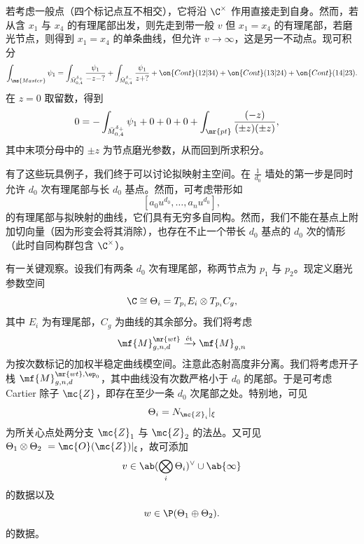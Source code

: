 \begin{exm}
    若考虑一般点（四个标记点互不相交），它将沿 \(\C^{\times}\) 作用直接走到自身。然而，若从含 \(x_1\) 与 \(x_4\) 的有理尾部出发，则先走到带一般 \(v\) 但 \(x_1 = x_4\) 的有理尾部，若磨光节点，则得到 \(x_1 = x_4\) 的单条曲线，但允许 \(v \to \infty\)，这是另一不动点。现可积分
    \begin{align*}
        \int_{\ms{Master}} \psi_1 = \int_{\bar{M}_{0,4}^{\delta_+}} \frac{\psi_1}{-z-?} + \int_{\bar{M}_{0,4}^{\delta_-}} \frac{\psi_1}{z+?} + \on{Cont}(12|34) + \on{Cont}(13|24) + \on{Cont}(14|23).
    \end{align*}
    在 \(z = 0\) 取留数，得到
    \begin{align*}
        0 &= - \int_{\bar{M}_{0,4}^{\delta_+}} \psi_1 + 0 + 0 + 0 + \int_{\mr{pt}} \frac{(-z)}{(\pm z)(\pm z)},
    \end{align*}
    其中末项分母中的 \(\pm z\) 为节点磨光参数，从而回到所求积分。
\end{exm}

有了这些玩具例子，我们终于可以讨论拟映射主空间。在 \(\frac{1}{d_0}\) 墙处的第一步是同时允许 \(d_0\) 次有理尾部与长 \(d_0\) 基点。然而，可考虑带形如
\[ [a_0 u^{d_0}, \ldots, a_n u^{d_0}], \]
的有理尾部与拟映射的曲线，它们具有无穷多自同构。然而，我们不能在基点上附加切向量（因为形变会将其消除），也存在不止一个带长 \(d_0\) 基点的 \(d_0\) 次的情形（此时自同构群包含 \(\C^{\times}\)）。

\begin{rmk}
    有一关键观察。设我们有两条 \(d_0\) 次有理尾部，称两节点为 \(p_1\) 与 \(p_2\)。现定义磨光参数空间
    \[ \C \cong \Theta_i = T_{p_i} E_i \otimes T_{p_i} C_g, \]
    其中 \(E_i\) 为有理尾部，\(C_g\) 为曲线的其余部分。我们将考虑
    \[ \mf{M}_{g,n,d}^{\mr{wt}} \xrightarrow{\text{\'et}} \mf{M}_{g,n} \]
    为按次数标记的加权半稳定曲线模空间。注意此态射高度非分离。我们将考虑开子栈 \(\mf{M}_{g,n,d}^{\mr{wt}, \ep_0}\)，其中曲线没有次数严格小于 \(d_0\) 的尾部。于是可考虑 Cartier 除子 \(\mc{Z}\)，即存在至少一条 \(d_0\) 次尾部之处。特别地，可见
    \[ \Theta_i = N_{\mc{Z}_i} |_{\xi} \]
    为所关心点处两分支 \(\mc{Z}_1\) 与 \(\mc{Z}_2\) 的法丛。又可见 \(\Theta_1 \otimes \Theta_2\ = \mc{O}(\mc{Z})|_{\xi}\)，故可添加
    \[ v \in \ab(\bigotimes_i \Theta_i)^{\vee} \cup \ab\{\infty\} \]
    的数据以及
    \[ w \in \P(\Theta_1 \oplus\Theta_2). \]
    的数据。
\end{rmk}

